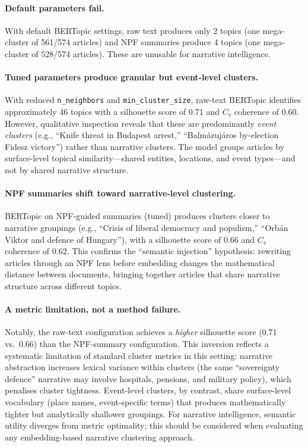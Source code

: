 \documentclass[10pt, a4paper]{article}
\begin{document}
\paragraph{Default parameters fail.}
With default BERTopic settings, raw text produces only 2 topics (one mega-cluster of 561/574 articles) and NPF summaries produce 4 topics (one mega-cluster of 528/574 articles). These are unusable for narrative intelligence.

\paragraph{Tuned parameters produce granular but event-level clusters.}
With reduced \texttt{n\_neighbors} and \texttt{min\_cluster\_size}, raw-text BERTopic identifies approximately 46 topics with a silhouette score of 0.71 and $C_v$ coherence of 0.60. However, qualitative inspection reveals that these are predominantly \emph{event clusters} (e.g., ``Knife threat in Budapest arrest,'' ``Balm\'azuj\'aros by-election Fidesz victory'') rather than narrative clusters. The model groups articles by surface-level topical similarity---shared entities, locations, and event types---and not by shared narrative structure.

\paragraph{NPF summaries shift toward narrative-level clustering.}
BERTopic on NPF-guided summaries (tuned) produces clusters closer to narrative groupings (e.g., ``Crisis of liberal democracy and populism,'' ``Orb\'an Viktor and defence of Hungary''), with a silhouette score of 0.66 and $C_v$ coherence of 0.62. This confirms the ``semantic injection'' hypothesis: rewriting articles through an NPF lens before embedding changes the mathematical distance between documents, bringing together articles that share narrative structure across different topics.

\paragraph{A metric limitation, not a method failure.}
Notably, the raw-text configuration achieves a \emph{higher} silhouette score (0.71 vs.\ 0.66) than the NPF-summary configuration. This inversion reflects a systematic limitation of standard cluster metrics in this setting: narrative abstraction increases lexical variance within clusters (the same ``sovereignty defence'' narrative may involve hospitals, pensions, and military policy), which penalises cluster tightness. Event-level clusters, by contrast, share surface-level vocabulary (place names, event-specific terms) that produces mathematically tighter but analytically shallower groupings. For narrative intelligence, semantic utility diverges from metric optimality; this should be considered when evaluating any embedding-based narrative clustering approach.
\end{document}
